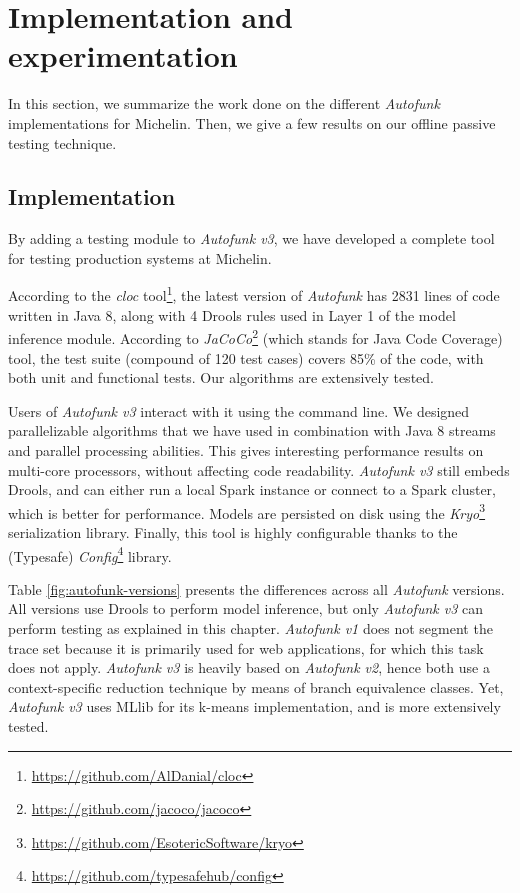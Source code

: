 \section{Implementation and experimentation}
\label{sec:testing:offline:impl-exp}

In this section, we summarize the work done on the different
\emph{Autofunk} implementations for Michelin. Then, we give a few
results on our offline passive testing technique.

\subsection{Implementation}

By adding a testing module to \emph{Autofunk v3}, we have
developed a complete tool for testing production systems at
Michelin.

According to the \emph{cloc}
tool\footnote{\url{https://github.com/AlDanial/cloc}}, the latest
version of \emph{Autofunk} has 2831 lines of code written in Java
8, along with 4 Drools rules used in Layer 1 of the model
inference module.  According to
\emph{JaCoCo}\footnote{\url{https://github.com/jacoco/jacoco}}
(which stands for Java Code Coverage) tool, the test suite
(compound of 120 test cases) covers 85\% of the code, with both
unit and functional tests. Our algorithms are extensively tested.

Users of \emph{Autofunk v3} interact with it using the command
line. We designed parallelizable algorithms that we have used in
combination with Java 8 streams and parallel processing
abilities. This gives interesting performance results on
multi-core processors, without affecting code readability.
\emph{Autofunk v3} still embeds Drools, and can either run a
local Spark instance or connect to a Spark cluster, which is
better for performance.  Models are persisted on disk using the
\emph{Kryo}\footnote{\url{https://github.com/EsotericSoftware/kryo}}
serialization library. Finally, this tool is highly configurable
thanks to the (Typesafe)
\emph{Config}\footnote{\url{https://github.com/typesafehub/config}}
library.

Table \ref{fig:autofunk-versions} presents the differences
across all \emph{Autofunk} versions. All versions use Drools to
perform model inference, but only \emph{Autofunk v3} can perform
testing as explained in this chapter. \emph{Autofunk v1} does not
segment the trace set because it is primarily used for web
applications, for which this task does not apply. \emph{Autofunk
v3} is heavily based on \emph{Autofunk v2}, hence both use a
context-specific reduction technique by means of branch
equivalence classes. Yet, \emph{Autofunk v3} uses MLlib for its
k-means implementation, and is more extensively tested.

